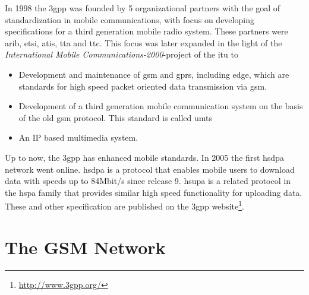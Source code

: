 In 1998 the \gls{3gpp} was founded by 5 organizational partners with the goal of standardization in mobile communications, with focus on developing specifications for a third generation mobile radio system.
These partners were \gls{arib}, \gls{etsi}, \gls{atis}, \gls{tta} and \gls{ttc}.
This focus was later expanded in the light of the \emph{International Mobile Communications-2000}-project \cite{3gpp_Proposal2000} of the \gls{itu} to 
\begin{itemize}
	\item Development and maintenance of \gls{gsm} and \gls{gprs}, including \gls{edge}, which are standards for high speed packet oriented data transmission via \gls{gsm}.
	\item Development of a third generation mobile communication system on the basis of the old \gls{gsm} protocol. This standard is called \gls{umts}
	\item An IP based multimedia system.
\end{itemize}
Up to now, the \gls{3gpp} has enhanced mobile standards.
In 2005 the first \gls{hsdpa} network went online.
\gls{hsdpa} \cite{hsdpa} is a protocol that enables mobile users to download data with speeds up to 84Mbit/s since release 9.
\gls{hsupa} \cite{hsupa} is a related protocol in the \gls{hspa} family that provides similar high speed functionality for uploading data.
These and other specification are published on the \gls{3gpp} website\footnote{\url{http://www.3gpp.org/}}.

\section{The GSM Network}
\label{sec:network}

